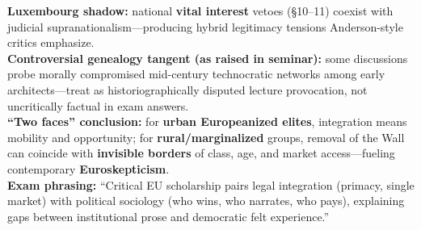 \documentclass[10pt,a4paper]{article}
\begin{document}
{\textbf{Luxembourg shadow:} national \textbf{vital interest} vetoes (\S 10--11) coexist with judicial supranationalism---producing hybrid legitimacy tensions Anderson-style critics emphasize.\\
\textbf{Controversial genealogy tangent (as raised in seminar):} some discussions probe morally compromised mid-century technocratic networks among early architects---treat as historiographically disputed lecture provocation, not uncritically factual in exam answers.\\
\textbf{``Two faces'' conclusion:} for \textbf{urban Europeanized elites}, integration means mobility and opportunity; for \textbf{rural/marginalized} groups, removal of the Wall can coincide with \textbf{invisible borders} of class, age, and market access---fueling contemporary \textbf{Euroskepticism}.\\
\textbf{Exam phrasing:} ``Critical EU scholarship pairs legal integration (primacy, single market) with political sociology (who wins, who narrates, who pays), explaining gaps between institutional prose and democratic felt experience.''
}
\end{document}
